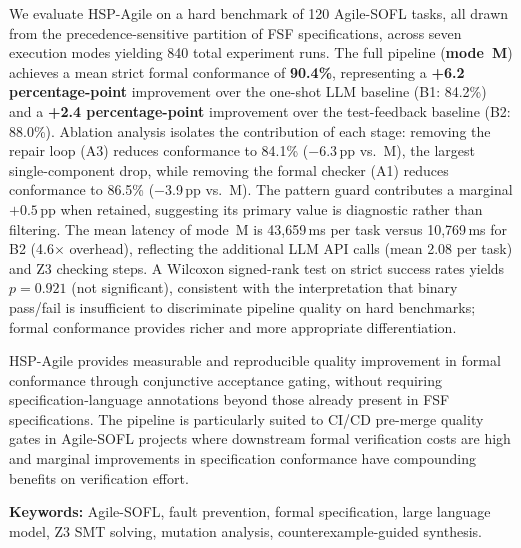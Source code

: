 We evaluate HSP-Agile on a hard benchmark of 120 Agile-SOFL tasks, all drawn from the
precedence-sensitive partition of FSF specifications, across seven execution modes yielding
840 total experiment runs.  The full pipeline (\textbf{mode~M}) achieves a mean strict
formal conformance of \textbf{90.4\%}, representing a \textbf{+6.2 percentage-point}
improvement over the one-shot LLM baseline (B1: 84.2\%) and a \textbf{+2.4
percentage-point} improvement over the test-feedback baseline (B2: 88.0\%).  Ablation
analysis isolates the contribution of each stage: removing the repair loop (A3) reduces
conformance to 84.1\% ($-$6.3\,pp vs.\ M), the largest single-component drop, while
removing the formal checker (A1) reduces conformance to 86.5\% ($-$3.9\,pp vs.\ M).
The pattern guard contributes a marginal $+0.5$\,pp when retained, suggesting its primary
value is diagnostic rather than filtering.  The mean latency of mode~M is
43{,}659\,ms per task versus 10{,}769\,ms for B2 (4.6$\times$ overhead), reflecting the
additional LLM API calls (mean 2.08 per task) and Z3 checking steps.  A Wilcoxon
signed-rank test on strict success rates yields $p = 0.921$ (not significant), consistent
with the interpretation that binary pass/fail is insufficient to discriminate pipeline
quality on hard benchmarks; formal conformance provides richer and more appropriate
differentiation.

HSP-Agile provides measurable and reproducible quality improvement in formal conformance
through conjunctive acceptance gating, without requiring specification-language annotations
beyond those already present in FSF specifications.  The pipeline is particularly suited
to CI/CD pre-merge quality gates in Agile-SOFL projects where downstream formal
verification costs are high and marginal improvements in specification conformance have
compounding benefits on verification effort.

\bigskip
\noindent\textbf{Keywords:} Agile-SOFL, fault prevention, formal specification, large
language model, Z3 SMT solving, mutation analysis, counterexample-guided synthesis.
